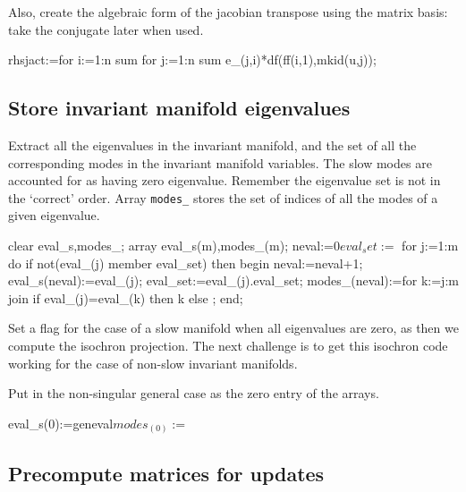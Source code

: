\documentclass[11pt,a5paper]{article}
\begin{document}
Also, create the algebraic form of the jacobian transpose
using the matrix basis: take the conjugate later when used.
\begin{reduce}
rhsjact:=for i:=1:n sum for j:=1:n sum 
    e_(j,i)*df(ff(i,1),mkid(u,j));
\end{reduce}




\subsection{Store invariant manifold eigenvalues}

Extract all the eigenvalues in the invariant manifold, and
the set of all the corresponding modes in the invariant
manifold variables. The slow modes are accounted for as
having zero eigenvalue. Remember the eigenvalue set is not in
the `correct' order. Array \verb|modes_| stores the set of
indices of all the modes of a given eigenvalue.
\begin{reduce}
clear eval_s,modes_;
array eval_s(m),modes_(m); 
neval:=0$ eval_set:={}$ 
for j:=1:m do if not(eval_(j) member eval_set) then begin
  neval:=neval+1; 
  eval_s(neval):=eval_(j);
  eval_set:=eval_(j).eval_set;
  modes_(neval):=for k:=j:m join 
    if eval_(j)=eval_(k) then {k} else {};
end;
\end{reduce}

Set a flag for the case of a slow manifold when all
eigenvalues are zero, as then we compute the isochron
projection. The next challenge is to get this isochron code
working for the case of non-slow invariant manifolds.

Put in the non-singular general case as the zero entry of
the arrays.
\begin{reduce}
eval_s(0):=geneval$
modes_(0):={}$
\end{reduce}





\subsection{Precompute matrices for updates}
\end{document}
